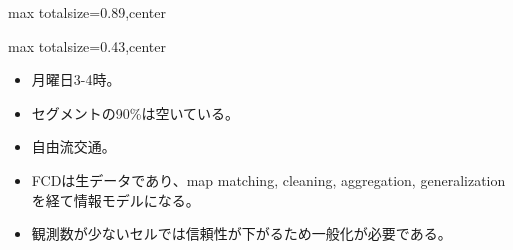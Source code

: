 \begin{minipage}[t]{0.58\textwidth}
\begin{adjustbox}{max totalsize={\textwidth}{0.89\textheight},center}
\begin{minipage}{\textwidth}
\end{minipage}
\end{adjustbox}
\end{minipage}


\clearpage
{}
\begin{minipage}[t]{0.405\textwidth}
\begin{adjustbox}{max totalsize={\textwidth}{0.43\textheight},center}
\begin{minipage}{\textwidth}\scriptsize
{}\begin{itemize}
\item 月曜日3-4時。
\item セグメントの90\%は空いている。
\item 自由流交通。
\end{itemize}\begin{itemize}
\item FCDは生データであり、map matching, cleaning, aggregation, generalization を経て情報モデルになる。
\item 観測数が少ないセルでは信頼性が下がるため一般化が必要である。
\end{itemize}
\end{minipage}
\end{adjustbox}
\end{minipage}\hfill
